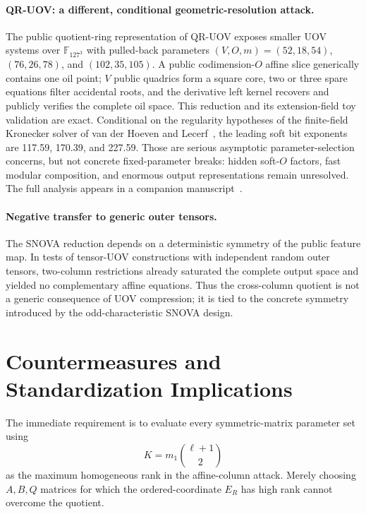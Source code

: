 \documentclass[runningheads]{llncs}
\newcommand{\F}{\mathbb F}
\newcommand{\SNOVA}{\textsf{SNOVA}}
\newcommand{\QRUOV}{\textsf{QR-UOV}}
\begin{document}
\paragraph{QR-UOV: a different, conditional geometric-resolution attack.}
The public quotient-ring representation of \QRUOV{} exposes smaller UOV systems over $\F_{127^3}$ with pulled-back parameters $(V,O,m)=(52,18,54)$, $(76,26,78)$, and $(102,35,105)$.  A public codimension-$O$ affine slice generically contains one oil point; $V$ public quadrics form a square core, two or three spare equations filter accidental roots, and the derivative left kernel recovers and publicly verifies the complete oil space.  This reduction and its extension-field toy validation are exact.  Conditional on the regularity hypotheses of the finite-field Kronecker solver of van der Hoeven and Lecerf~\cite{VanDerHoevenLecerf2021}, the leading soft bit exponents are 117.59, 170.39, and 227.59.  Those are serious asymptotic parameter-selection concerns, but not concrete fixed-parameter breaks: hidden soft-$O$ factors, fast modular composition, and enormous output representations remain unresolved.  The full analysis appears in a companion manuscript~\cite{QRUOVSpec}.

\paragraph{Negative transfer to generic outer tensors.}
The \SNOVA{} reduction depends on a deterministic symmetry of the public feature map.  In tests of tensor-UOV constructions with independent random outer tensors, two-column restrictions already saturated the complete output space and yielded no complementary affine equations.  Thus the cross-column quotient is not a generic consequence of UOV compression; it is tied to the concrete symmetry introduced by the odd-characteristic \SNOVA{} design.

\section{Countermeasures and Standardization Implications}\label{sec:countermeasures}

The immediate requirement is to evaluate every symmetric-matrix parameter set using
\[
 K=m_1\binom{\ell+1}{2}
\]
as the maximum homogeneous rank in the affine-column attack.  Merely choosing $A,B,Q$ matrices for which the ordered-coordinate $E_R$ has high rank cannot overcome the quotient.
\end{document}
